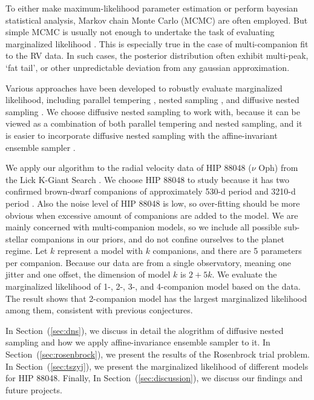 \documentclass[letterpaper, preprint]{aastex}
\begin{document}
To either make maximum-likelihood parameter estimation or perform bayesian statistical analysis, Markov chain Monte Carlo (MCMC) are often employed. But simple MCMC is usually not enough to undertake the task of evaluating marginalized likelihood \citep{ford07a}. This is especially true in the case of multi-companion fit to the RV data. In such cases, the posterior distribution often exhibit multi-peak, `fat tail', or other unpredictable deviation from any gaussian approximation. 

Various approaches have been developed to robustly evaluate marginalized likelihood, including parallel tempering \citep{ford07a}, nested sampling \citep{skilling06a}, and diffusive nested sampling \citep{brewer11a}. We choose diffusive nested sampling to work with, because it can be viewed as a combination of both parallel tempering and nested sampling, and it is easier to incorporate diffusive nested sampling with the affine-invariant ensemble sampler \citep{goodman10a, hou12a, foreman-mackey13a}.

We apply our algorithm to the radial velocity data of HIP 88048 ($\nu$ Oph) from the Lick K-Giant Search \citep{frink02a, mitchell03a, hekker06a, hekker08a, quirrenbach11a}. We choose HIP 88048 to study because it has two confirmed brown-dwarf companions of approximately 530-d period and 3210-d period \citep{quirrenbach11a}. Also the noise level of HIP 88048 is low, so over-fitting should be more obvious when excessive amount of companions are added to the model. We are mainly concerned with multi-companion models, so we include all possible sub-stellar companions in our priors, and do not confine ourselves to the planet regime. Let $k$ represent a model with $k$ companions, and there are 5 parameters per companion. Because our data are from a single observatory, meaning one jitter and one offset, the dimension of model $k$ is $2+5k$. We evaluate the marginalized likelihood of 1-, 2-, 3-, and 4-companion model based on the data. The result shows that 2-companion model has the largest marginalized likelihood among them, consistent with previous conjectures.

In Section~(\ref{sec:dns}), we discuss in detail the alogrithm of diffusive nested sampling and how we apply affine-invariance ensemble sampler to it. In Section~(\ref{sec:rosenbrock}), we present the results of the Rosenbrock trial problem. In Section~(\ref{sec:tszyj}), we present the marginalized likelihood of different models for HIP 88048. Finally, In Section~(\ref{sec:discussion}), we discuss our findings and future projects. 
\end{document}
